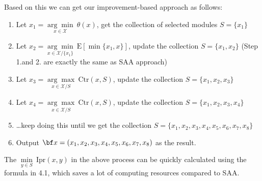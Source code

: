 \documentclass[opre,sglanonrev]{informs4}
\begin{document}
Based on this we can get our improvement-based approach as follows:
\begin{enumerate}
	\item Let $x_1 = \underset{x\in \mathcal{X}}{{\arg\min}}~\theta(x)$, get the collection of selected modules $S = \{x_1\}$
	\item Let $x_2 = \underset{x\in \mathcal{X}/\{x_1\}}{{\arg\min}}~\text{E}[\min\{x_1, x\}]$, update the collection $S = \{x_1,x_2\}$ (Step 1.and 2. are exactly the same as SAA approach)
	\item Let $x_3 = \underset{x\in \mathcal{X}/S}{{\arg\max}}~\text{Ctr}(x, S)$, update the collection $S = \{x_1,x_2,x_3\}$
	\item Let $x_4 = \underset{x\in \mathcal{X}/S}{{\arg\max}}~\text{Ctr}(x, S)$, update the collection $S = \{x_1,x_2,x_3,x_4\}$
	\item \ldots keep doing this until we get the collection $S = \{x_1,x_2,x_3,x_4,x_5,x_6,x_7,x_8\}$
	\item Output ${\bf x} = (x_1,x_2,x_3,x_4,x_5,x_6,x_7,x_8)$ as the result.
\end{enumerate}
The $\underset{y\in S}{{\min}}~\text{Ipr}(x,y)$ in the above process  can be quickly calculated using the formula in 4.1, which saves a lot of computing resources compared to SAA.
\end{document}
